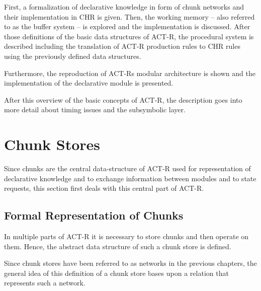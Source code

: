 First, a formalization of declarative knowledge in form of chunk networks and their implementation in CHR is given. Then, the working memory -- also referred to as the buffer system -- is explored and the implementation is discussed. After those definitions of the basic data structures of ACT-R, the procedural system is described including the translation of ACT-R production rules to CHR rules using the previously defined data structures.

Furthermore, the reproduction of ACT-Rs modular architecture is shown and the implementation of the declarative module is presented.

After this overview of the basic concepts of ACT-R, the description goes into more detail about timing issues and the subsymbolic layer.

\section{Chunk Stores}

Since chunks are the central data-structure of ACT-R used for representation of declarative knowledge and to exchange information between modules and to state requests, this section first deals with this central part of ACT-R.

\subsection{Formal Representation of Chunks}

In multiple parts of ACT-R it is necessary to store chunks and then operate on them. Hence, the abstract data structure of such a chunk store is defined.

Since chunk stores have been referred to as networks in the previous chapters, the general idea of this definition of a chunk store bases upon a relation that represents such a network.

